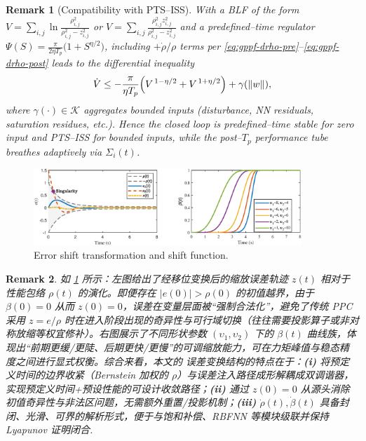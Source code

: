 \documentclass[pdflatex,sn-mathphys-num]{sn-jnl}%
\theoremstyle{thmstyleone}%
\theoremstyle{thmstyletwo}%
\newtheorem{remark}{Remark}%
\theoremstyle{thmstylethree}%
\begin{document}
\begin{remark}[Compatibility with PTS–ISS]
With a BLF of the form $V=\sum_{i,j}\ln\frac{\rho_{i,j}^2}{\rho_{i,j}^2-z_{i,j}^2}$ or $V=\sum_{i,j}\frac{\rho_{i,j}^2 z_{i,j}^2}{\rho_{i,j}^2-z_{i,j}^2}$ and a predefined–time regulator
$\Psi(S)=\frac{\pi}{2\eta T_p}\bigl(1+S^{\eta/2}\bigr)$,
including $+\dot\rho/\rho$ terms per \eqref{eq:gppf-drho-pre}–\eqref{eq:gppf-drho-post}
leads to the differential inequality
\[
\dot V \le -\frac{\pi}{\eta T_p}\Bigl(V^{\,1-\eta/2}+V^{\,1+\eta/2}\Bigr)+\gamma(\|w\|),
\]
where $\gamma(\cdot)\in\mathcal K$ aggregates bounded inputs (disturbance, NN residuals, saturation residues, etc.). Hence the closed loop is predefined–time stable for zero input and PTS–ISS for bounded inputs, while the post–$T_p$ performance tube breathes adaptively via $\Sigma_i(t)$.
\end{remark}



\begin{figure}[H]
	\centering
	\includegraphics[width=0.9\textwidth]{fig1.eps}
	\caption{Error shift transformation and shift function.}
	\label{fig:1}
\end{figure}
\begin{remark}
	如 \cref{fig:1} 所示：左图给出了经移位变换后的缩放误差轨迹 $z(t)$ 相对于性能包络 $\rho(t)$ 的演化。即便存在 $|e(0)|>\rho(0)$ 的初值越界，由于 $\beta(0)=0$ 从而 $z(0)=0$，误差在变量层面被“强制合法化”，避免了传统 PPC 采用 $z=e/\rho$ 时在进入阶段出现的奇异性与可行域切换（往往需要投影算子或非对称放缩等权宜修补）。右图展示了不同形状参数 $(\upsilon_1,\upsilon_2)$ 下的 $\beta(t)$ 曲线族，体现出“前期更缓/更陡、后期更快/更慢”的可调缩放能力，可在力矩峰值与稳态精度之间进行显式权衡。综合来看，本文的 误差变换结构的特点在于：\textbf{(i)} 将预定义时间的边界收紧（Bernstein 加权的 $\rho$）与误差注入路径成形解耦成双调谐器，实现预定义时间+预设性能的可设计收敛路径；\textbf{(ii)} 通过 $z(0)=0$ 从源头消除初值奇异性与非法区问题，无需额外重置/投影机制；\textbf{(iii)} $\dot\rho(t),\dot\beta(t)$ 具备封闭、光滑、可界的解析形式，便于与饱和补偿、RBFNN 等模块级联并保持 Lyapunov 证明闭合.
	\end{remark}
	
\end{document}
